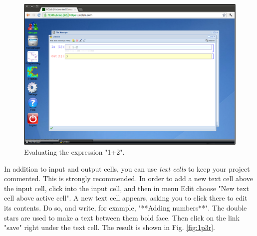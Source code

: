 \documentclass[article,A4,12pt]{llncs}
\begin{document}
\newpage
\begin{figure}[!ht]
\begin{center}
\includegraphics[width=\textwidth]{img/1p3.png}
\end{center}
\caption{Evaluating the expression "1+2".}
\label{fig:1p3}
\end{figure}
\noindent
\noindent
In addition to input and output cells, you can use {\em text cells}
to keep your project commented. This is strongly recommended. In
order to add a new text cell above the input cell, click into
the input cell, and then in menu Edit choose "New text cell above
active cell". A new text cell appears, asking you to click there to
edit its contents. Do so, and write, for example, "**Adding numbers**".
The double stars are used to make a text between them bold face. 
Then click on the link "save" right under the text cell. The result 
is shown in Fig. \ref{fig:1p3r}.
\end{document}
